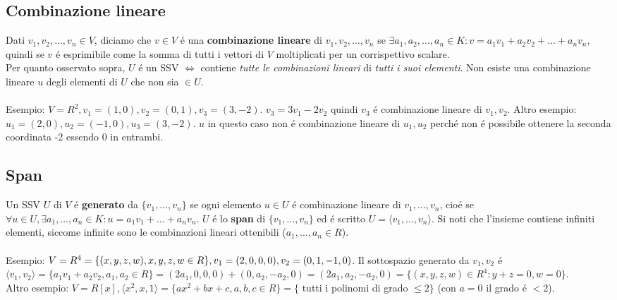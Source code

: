 \documentclass{article}
\begin{document}
\subsection{Combinazione lineare}
Dati $v_1, v_2, \dots, v_n \in V$, diciamo che $v \in V$ é una \textbf{combinazione lineare} di $v_1, v_2, \dots, v_n$ se $\exists a_1, a_2, \dots, a_n \in K : v = a_1 v_1 + a_2 v_2 + \dots + a_n v_n$, quindi se $v$ é esprimibile come la somma di tutti i vettori di $V$ moltiplicati per un corrispettivo scalare.\\
Per quanto osservato sopra, $U$ é un SSV $\iff$ contiene \textit{tutte le combinazioni lineari} di \textit{tutti i suoi elementi}. Non esiste una combinazione lineare $u$ degli elementi di $U$ che non sia $\in U$.\\\\
Esempio: $V = R^2, v_1 = (1,0), v_2 = (0,1), v_3 = (3, -2)$. $v_3 = 3v_1 -2v_2$ quindi $v_3$ é combinazione lineare di $v_1, v_2$. Altro esempio: $u_1 = (2,0), u_2 = (-1, 0), u_3 = (3, -2)$. $u$ in questo caso non é combinazione lineare di $u_1, u_2$ perché non é possibile ottenere la seconda coordinata -2 essendo 0 in entrambi.

\subsection{Span}
Un SSV $U$ di $V$ é \textbf{generato} da $\{v_1, \dots, v_n\}$ se ogni elemento $u \in U$ é combinazione lineare di $v_1, \dots, v_n$, cioé se $\forall u \in U, \exists a_1, \dots, a_n \in K : u = a_1 v_1 + \dots + a_n v_n$. $U$ é lo \textbf{span} di $\{v_1, \dots, v_n\}$ ed é scritto $U = \langle v_1, \dots, v_n \rangle$. Si noti che l'insieme contiene infiniti elementi, siccome infinite sono le combinazioni lineari ottenibili ($a_1, \dots, a_n \in R$).\\\\
Esempio: $
V = R^4 = \{(x,y,z,w), x,y,z,w \in R\}, \\
v_1 = (2,0,0,0), v_2 = (0,1,-1,0)
$. Il sottospazio generato da $v_1, v_2$ é $\langle v_1, v_2 \rangle = \{a_1 v_1 + a_2 v_2, a_1, a_2 \in R\} = (2a_1,0,0,0) + (0,a_2,-a_2,0) = (2a_1,a_2,-a_2,0) = \{(x,y,z,w) \in R^4 : y + z = 0, w = 0\}$.\\
Altro esempio: $V = R[x], \langle x^2, x, 1 \rangle = \{ax^2+bx+c, a,b,c \in R\} = \{$ tutti i polinomi di grado $\leq 2\}$ (con $a=0$ il grado é $< 2$).
\end{document}
